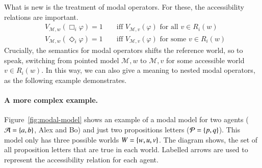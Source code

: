 \documentclass[nobib,nofonts]{tufte-handout}
\renewcommand{\phi}{\ensuremath{\varphi}}
\newcommand{\Model}{\ensuremath{\mathcal{M}}}
\begin{document}
\noindent What is new is the treatment of modal operators.
For these, the accessibility relations are important.
%
\begin{align*}
    & V_{\Model, w}(\Box_i \phi) = 1 & & \text{ \ iff \ } V_{\Model, v}(\phi) \text{ for all $v \in R_i(w)$} \\
    & V_{\Model, w}(\Diamond_i \phi) = 1 & & \text{ \ iff \ } V_{\Model, v}(\phi) \text{ for some $v \in R_i(w)$}
\end{align*}
%
Crucially, the semantics for modal operators shifts the reference world, so to speak, switching from pointed model $\Model, w$ to $\Model, v$ for some accessible world $v \in R_{i}(w)$.
In this way, we can also give a meaning to nested modal operators, as the following example demonstrates.

\paragraph{A more complex example.}
Figure~\ref{fig:modal-model} shows an example of a modal model for two agents ($\mathcal{A} = \left\{a,b\right\}$, Alex and Bo) and just two propositions letters ($\mathcal{P} = \left\{p, q\right\}$).
This model only has three possible worlds $W = \left\{w,u,v\right\}$.
The diagram shows, the set of all proposition letters that are true in each world.
Labelled arrows are used to represent the accessibility relation for each agent.
\end{document}
